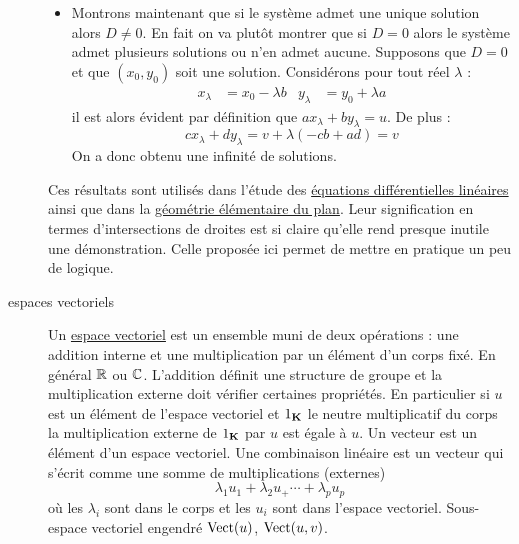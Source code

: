 \begin{description}
\begin{demo}
\begin{itemize}
\item Montrons maintenant que si le système admet une unique solution alors $D\neq 0$. En fait on va plutôt montrer que si $D=0$ alors le système admet plusieurs solutions ou n'en admet aucune.\newline
Supposons que $D=0$ et que $(x_0,y_0)$ soit une solution. Considérons pour tout réel $\lambda$ :
\begin{align*}
 x_\lambda &= x_0 -\lambda b & y_\lambda &= y_0 +\lambda a
\end{align*}
il est alors évident par définition que $ax_\lambda + by_\lambda =u$. De plus :
\begin{displaymath}
 cx_\lambda + dy_\lambda = v +\lambda(-cb+ad)=v
\end{displaymath}
On a donc obtenu une infinité de solutions.
\end{itemize}
\end{demo}

Ces résultats sont utilisés dans l'étude des \href{\baseurl C1616.pdf}{équations différentielles linéaires} ainsi que dans la \href{\baseurl C2005.pdf}{géométrie élémentaire du plan}. Leur signification en termes d'intersections de droites est si claire qu'elle rend presque inutile une démonstration. Celle proposée ici permet de mettre en pratique un peu de logique.

\item[espaces vectoriels] 
Un \href{\baseurl C2076.pdf}{espace vectoriel} est un ensemble muni de deux opérations : une addition interne et une multiplication par un élément d'un corps fixé. En général $\mathbb{R}$ ou $\mathbb{C}$. L'addition définit une structure de groupe et la multiplication externe doit vérifier certaines propriétés. En particulier si $u$ est un élément de l'espace vectoriel et $1_{\mathbf{K}}$ le neutre multiplicatif du corps la multiplication externe de $1_{\mathbf{K}}$ par $u$ est égale à $u$.\newline
Un vecteur est un élément d'un espace vectoriel.\newline
Une combinaison linéaire est un vecteur qui s'écrit comme une somme de multiplications (externes)
\begin{displaymath}
 \lambda_1 u_1 + \lambda_2 u_ + \cdots + \lambda_p u_p   
\end{displaymath}
où les $\lambda_i$ sont dans le corps et les $u_i$ sont dans l'espace vectoriel. 
Sous-espace vectoriel engendré $\mathop{\mathrm{Vect}}(u)$, $\mathop{\mathrm{Vect}}(u,v)$.



\end{description}
